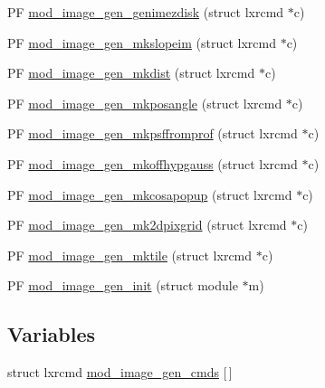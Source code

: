 \begin{DoxyCompactItemize}
\item 
P\+F \hyperlink{src_2image__gen_2image__gen-util_8c_a1890dde947828ecf0db0ae31ab8fe323}{mod\+\_\+image\+\_\+gen\+\_\+genimezdisk} (struct lxrcmd $\ast$c)
\item 
P\+F \hyperlink{src_2image__gen_2image__gen-util_8c_a2ae4393654913c334053966b038c1e51}{mod\+\_\+image\+\_\+gen\+\_\+mkslopeim} (struct lxrcmd $\ast$c)
\item 
P\+F \hyperlink{src_2image__gen_2image__gen-util_8c_abe4d5f47d07a88f8471d7fd98ea0088e}{mod\+\_\+image\+\_\+gen\+\_\+mkdist} (struct lxrcmd $\ast$c)
\item 
P\+F \hyperlink{src_2image__gen_2image__gen-util_8c_a6f6b1ee7da2f1bf0f5dc75a09527333f}{mod\+\_\+image\+\_\+gen\+\_\+mkposangle} (struct lxrcmd $\ast$c)
\item 
P\+F \hyperlink{src_2image__gen_2image__gen-util_8c_a14e84bbb654ac751fdd712ce247164b0}{mod\+\_\+image\+\_\+gen\+\_\+mkpsffromprof} (struct lxrcmd $\ast$c)
\item 
P\+F \hyperlink{src_2image__gen_2image__gen-util_8c_ae821234a9154b6d81e509af455a602e6}{mod\+\_\+image\+\_\+gen\+\_\+mkoffhypgauss} (struct lxrcmd $\ast$c)
\item 
P\+F \hyperlink{src_2image__gen_2image__gen-util_8c_a42da0c73d4d1136a5014c3047e12fa30}{mod\+\_\+image\+\_\+gen\+\_\+mkcosapopup} (struct lxrcmd $\ast$c)
\item 
P\+F \hyperlink{src_2image__gen_2image__gen-util_8c_a2184de39a978f1cb17f72ccec538b5ce}{mod\+\_\+image\+\_\+gen\+\_\+mk2dpixgrid} (struct lxrcmd $\ast$c)
\item 
P\+F \hyperlink{src_2image__gen_2image__gen-util_8c_a3860c261494668ad27c3d28f4df86ed5}{mod\+\_\+image\+\_\+gen\+\_\+mktile} (struct lxrcmd $\ast$c)
\item 
P\+F \hyperlink{src_2image__gen_2image__gen-util_8c_a39f7d02a1dd93431130cc46b2ea9d12d}{mod\+\_\+image\+\_\+gen\+\_\+init} (struct module $\ast$m)
\end{DoxyCompactItemize}
\subsection*{Variables}
\begin{DoxyCompactItemize}
\item 
struct lxrcmd \hyperlink{src_2image__gen_2image__gen-util_8c_a834a38cb923e0cb0137c34b26f209fb2}{mod\+\_\+image\+\_\+gen\+\_\+cmds} \mbox{[}$\,$\mbox{]}
\end{DoxyCompactItemize}


